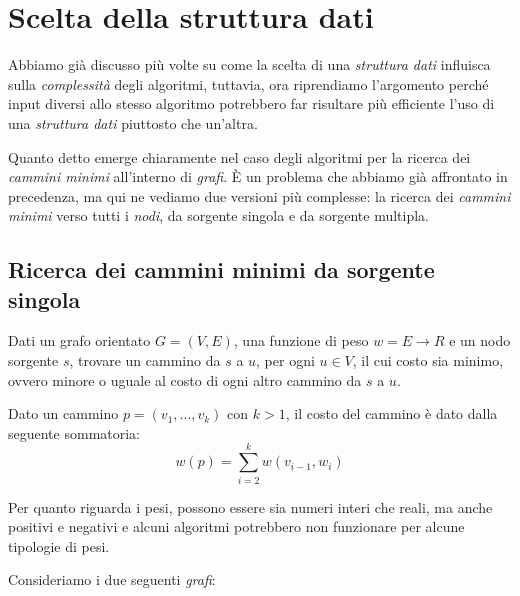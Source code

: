 \chapter{Scelta della struttura dati}
Abbiamo già discusso più volte su come la scelta di una \emph{struttura dati}
influisca sulla \emph{complessità} degli algoritmi, tuttavia, ora riprendiamo
l'argomento perché input diversi allo stesso algoritmo potrebbero far risultare
più efficiente l'uso di una \emph{struttura dati} piuttosto che un'altra.

Quanto detto emerge chiaramente nel caso degli algoritmi per la ricerca dei
\emph{cammini minimi} all'interno di \emph{grafi}. È un problema che abbiamo già
affrontato in precedenza, ma qui ne vediamo due versioni più complesse: la
ricerca dei \emph{cammini minimi} verso tutti i \emph{nodi}, da sorgente singola
e da sorgente multipla.

\section{Ricerca dei cammini minimi da sorgente singola}
\begin{problem}
    Dati un grafo orientato $G=(V,E)$, una funzione di peso $w=E\to R$ e un
    nodo sorgente $s$, trovare un cammino da $s$ a $u$, per ogni $u\in V$, il
    cui costo sia minimo, ovvero minore o uguale al costo di ogni altro cammino
    da $s$ a $u$.
\end{problem}
\begin{definition}
    Dato un cammino $p=\left(v_1,\dots,v_k\right)$ con $k>1$, il costo del
    cammino è dato dalla seguente sommatoria:
    \[w(p)=\sum_{i=2}^k w(v_{i-1},w_i)\]
\end{definition}\noindent
Per quanto riguarda i pesi, possono essere sia numeri interi che reali, ma anche
positivi e negativi e alcuni algoritmi potrebbero non funzionare per alcune
tipologie di pesi.

\bigskip\noindent
Consideriamo i due seguenti \emph{grafi}:

